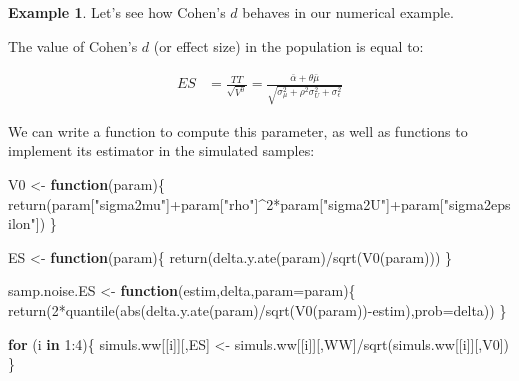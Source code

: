 \documentclass[
]{book}
\newenvironment{Shaded}{\begin{snugshade}}{\end{snugshade}}
\newcommand{\AttributeTok}[1]{\textcolor[rgb]{0.77,0.63,0.00}{#1}}
\newcommand{\ControlFlowTok}[1]{\textcolor[rgb]{0.13,0.29,0.53}{\textbf{#1}}}
\newcommand{\DecValTok}[1]{\textcolor[rgb]{0.00,0.00,0.81}{#1}}
\newcommand{\FunctionTok}[1]{\textcolor[rgb]{0.00,0.00,0.00}{#1}}
\newcommand{\NormalTok}[1]{#1}
\newcommand{\OtherTok}[1]{\textcolor[rgb]{0.56,0.35,0.01}{#1}}
\newcommand{\SpecialCharTok}[1]{\textcolor[rgb]{0.00,0.00,0.00}{#1}}
\newcommand{\StringTok}[1]{\textcolor[rgb]{0.31,0.60,0.02}{#1}}
\theoremstyle{definition}
\theoremstyle{definition}
\newtheorem{example}{Example}[chapter]
\theoremstyle{definition}
\theoremstyle{definition}
\theoremstyle{remark}
\begin{document}
\begin{example}
\protect\hypertarget{exm:unnamed-chunk-41}{}{\label{exm:unnamed-chunk-41} }Let's see how Cohen's \(d\) behaves in our numerical example.
\end{example}

The value of Cohen's \(d\) (or effect size) in the population is equal to:

\begin{align*}
  ES & = \frac{TT}{\sqrt{V^0}} = \frac{\bar{\alpha}+\theta\bar{\mu}}{\sqrt{\sigma^2_{\mu}+\rho^2\sigma^2_{U}+\sigma^2_{\epsilon}}}
\end{align*}

We can write a function to compute this parameter, as well as functions to implement its estimator in the simulated samples:

\begin{Shaded}
\begin{Highlighting}[]
\NormalTok{V0 }\OtherTok{\textless{}{-}} \ControlFlowTok{function}\NormalTok{(param)\{}
  \FunctionTok{return}\NormalTok{(param[}\StringTok{"sigma2mu"}\NormalTok{]}\SpecialCharTok{+}\NormalTok{param[}\StringTok{"rho"}\NormalTok{]}\SpecialCharTok{\^{}}\DecValTok{2}\SpecialCharTok{*}\NormalTok{param[}\StringTok{"sigma2U"}\NormalTok{]}\SpecialCharTok{+}\NormalTok{param[}\StringTok{"sigma2epsilon"}\NormalTok{])}
\NormalTok{\}}

\NormalTok{ES }\OtherTok{\textless{}{-}} \ControlFlowTok{function}\NormalTok{(param)\{}
  \FunctionTok{return}\NormalTok{(}\FunctionTok{delta.y.ate}\NormalTok{(param)}\SpecialCharTok{/}\FunctionTok{sqrt}\NormalTok{(}\FunctionTok{V0}\NormalTok{(param)))}
\NormalTok{\}}

\NormalTok{samp.noise.ES }\OtherTok{\textless{}{-}} \ControlFlowTok{function}\NormalTok{(estim,delta,}\AttributeTok{param=}\NormalTok{param)\{}
  \FunctionTok{return}\NormalTok{(}\DecValTok{2}\SpecialCharTok{*}\FunctionTok{quantile}\NormalTok{(}\FunctionTok{abs}\NormalTok{(}\FunctionTok{delta.y.ate}\NormalTok{(param)}\SpecialCharTok{/}\FunctionTok{sqrt}\NormalTok{(}\FunctionTok{V0}\NormalTok{(param))}\SpecialCharTok{{-}}\NormalTok{estim),}\AttributeTok{prob=}\NormalTok{delta))}
\NormalTok{\}}

\ControlFlowTok{for}\NormalTok{ (i }\ControlFlowTok{in} \DecValTok{1}\SpecialCharTok{:}\DecValTok{4}\NormalTok{)\{}
\NormalTok{  simuls.ww[[i]][,}\StringTok{\textquotesingle{}ES\textquotesingle{}}\NormalTok{] }\OtherTok{\textless{}{-}}\NormalTok{ simuls.ww[[i]][,}\StringTok{\textquotesingle{}WW\textquotesingle{}}\NormalTok{]}\SpecialCharTok{/}\FunctionTok{sqrt}\NormalTok{(simuls.ww[[i]][,}\StringTok{\textquotesingle{}V0\textquotesingle{}}\NormalTok{])}
\NormalTok{\}}
\end{Highlighting}
\end{Shaded}
\end{document}
